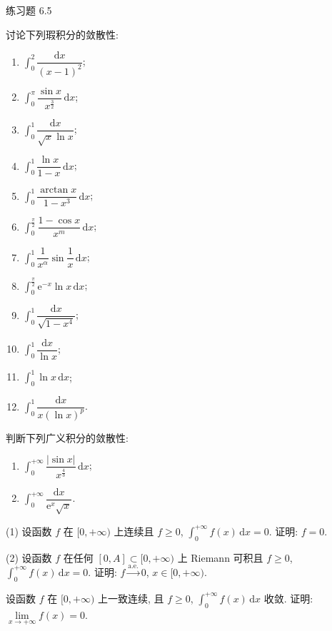 \begin{exblock}{练习题 6.5}
  \item 讨论下列瑕积分的敛散性:
  \begin{enumerate}[label=(\arabic*)]
    \item $\int_{0}^{2}\dfrac{\mathrm{d}x}{(x-1)^{2}}$;
    \item $\int_{0}^{\pi}\dfrac{\sin x}{x^{\frac{3}{2}}}\,\mathrm{d}x$;
    \item $\int_{0}^{1}\dfrac{\mathrm{d}x}{\sqrt{x}\ln x}$;
    \item $\int_{0}^{1}\dfrac{\ln x}{1-x}\,\mathrm{d}x$;
    \item $\int_{0}^{1}\dfrac{\arctan x}{1-x^{3}}\,\mathrm{d}x$;
    \item $\int_{0}^{\frac{\pi}{2}}\dfrac{1-\cos x}{x^{m}}\,\mathrm{d}x$;
    \item $\int_{0}^{1}\dfrac{1}{x^{\alpha}}\sin\dfrac{1}{x}\,\mathrm{d}x$;
    \item $\int_{0}^{\frac{\pi}{2}}\mathrm{e}^{-x}\ln x\,\mathrm{d}x$;
    \item $\int_{0}^{1}\dfrac{\mathrm{d}x}{\sqrt{1-x^{4}}}$;
    \item $\int_{0}^{1}\dfrac{\mathrm{d}x}{\ln x}$;
    \item $\int_{0}^{1}\ln x\,\mathrm{d}x$;
    \item $\int_{0}^{1}\dfrac{\mathrm{d}x}{x(\ln x)^{p}}$.
  \end{enumerate}

  \item 判断下列广义积分的敛散性:
  \begin{enumerate}[label=(\arabic*)]
    \item $\int_{0}^{+\infty}\dfrac{|\sin x|}{x^{\frac{4}{3}}}\,\mathrm{d}x$;
    \item $\int_{0}^{+\infty}\dfrac{\mathrm{d}x}{\mathrm{e}^{x}\sqrt{x}}$.
  \end{enumerate}

  \item (1) 设函数 $f$ 在 $[0,+\infty)$ 上连续且 $f\geqslant0$, $\int_{0}^{+\infty}f(x)\,\mathrm{d}x=0$. 证明: $f=0$.

  (2) 设函数 $f$ 在任何 $[0,A]\subset[0,+\infty)$ 上 Riemann 可积且 $f\geqslant0$, $\int_{0}^{+\infty}f(x)\,\mathrm{d}x=0$. 证明: $f\xrightarrow{\text{a.e.}}0$, $x\in[0,+\infty)$.

  \item 设函数 $f$ 在 $[0,+\infty)$ 上一致连续, 且 $f\geqslant0$, $\int_{0}^{+\infty}f(x)\,\mathrm{d}x$ 收敛. 证明: $\lim\limits_{x\to+\infty}f(x)=0$.


\end{exblock}
